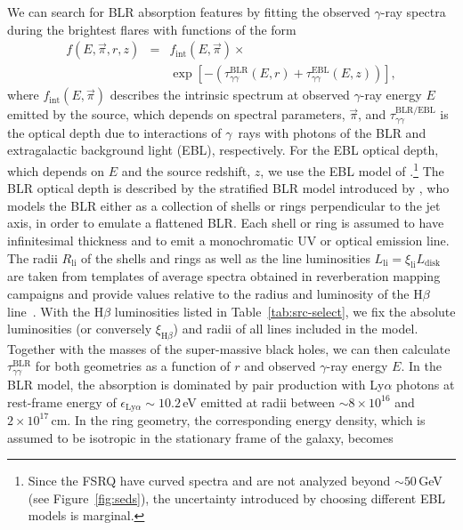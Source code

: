 \documentclass[twocolumn,linenumbers]{aastex62}
\newcommand{\Grays}{$\gamma$~rays\xspace}
\newcommand{\gray}{$\gamma$-ray\xspace}
\begin{document}
We can search for BLR absorption features by fitting the observed \gray spectra during the brightest flares with functions of the form 
\begin{eqnarray}
    f(E,\vec{\pi},r,z) &=& f_\mathrm{int}(E,\vec{\pi}) \times \nonumber \\ &{}& \exp\left[-\left(\tau_{\gamma\gamma}^\mathrm{BLR}(E,r) +\tau_{\gamma\gamma}^\mathrm{EBL}(E,z) \right)  \right],
\end{eqnarray} 
where $f_\mathrm{int}(E, \vec{\pi})$ describes the intrinsic spectrum at observed \gray energy $E$ emitted by the source, which depends on spectral parameters, $\vec{\pi}$, and $\tau_{\gamma\gamma}^\mathrm{BLR / EBL}$ is the optical depth due to interactions of \Grays with photons of the BLR and extragalactic background light (EBL), respectively. 
For the EBL optical depth, which depends on $E$ and the source redshift, $z$, we use the EBL model of \citet{2011MNRAS.410.2556D}.\footnote{
Since the FSRQ have curved spectra and are not analyzed beyond $\sim 50\,$GeV (see Figure~\ref{fig:seds}), the uncertainty introduced by choosing different EBL models is marginal.
}
The BLR optical depth is described by the stratified BLR model introduced by \citet{finke2016}, who models the BLR either as a collection of shells or rings perpendicular to the jet axis, in order to emulate a flattened BLR. 
Each shell or ring is assumed to have infinitesimal thickness and to emit a monochromatic UV or optical emission line. 
The radii $R_\mathrm{li}$ of the shells and rings as well as the line luminosities $L_\mathrm{li} = \xi_\mathrm{li}L_\mathrm{disk}$ are taken from templates of average spectra obtained in reverberation mapping campaigns and provide values relative to the radius and luminosity of the H$\beta$ line~\citep[see][for further details]{finke2016}.
With the H$\beta$ luminosities listed in Table~\ref{tab:src-select}, we fix the absolute luminosities (or conversely $\xi_{\mathrm{H}\beta}$) and radii of all lines included in the model.  
Together with the masses of the super-massive black holes, we can then calculate $\tau_{\gamma\gamma}^\mathrm{BLR}$ for both geometries as a function of $r$ and observed \gray energy $E$.
In the BLR model, the absorption is dominated by pair production with Ly$\alpha$ photons at rest-frame energy of $\epsilon_{\mathrm{Ly}\alpha}\sim10.2\,$eV emitted at radii between $\sim 8\times10^{16}$ and $2\times10^{17}$\,cm. 
In the ring geometry, the corresponding energy density, which is assumed to be isotropic in the stationary frame of the galaxy, becomes~\citep{finke2016}
\end{document}
